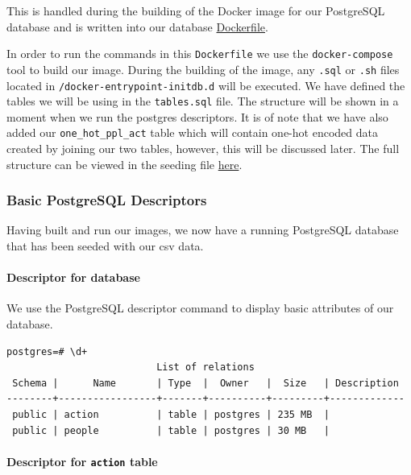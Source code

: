 \documentclass[]{report}
\begin{document}
This is handled during the building of the Docker image for our
PostgreSQL database and is written into our database
\href{https://github.com/joshuacook/redhat/blob/master/docker/postgres/Dockerfile}{Dockerfile}.

In order to run the commands in this \texttt{Dockerfile} we use the
\texttt{docker-compose} tool to build our image. During the building of
the image, any \texttt{.sql} or \texttt{.sh} files located in
\texttt{/docker-entrypoint-initdb.d} will be executed. We have defined
the tables we will be using in the \texttt{tables.sql} file. The
structure will be shown in a moment when we run the postgres
descriptors. It is of note that we have also added our
\texttt{one\_hot\_ppl\_act} table which will contain one-hot encoded
data created by joining our two tables, however, this will be discussed
later. The full structure can be viewed in the seeding file
\href{https://github.com/joshuacook/redhat/blob/master/docker/postgres/tables.sql}{here}.

\subsubsection{Basic PostgreSQL
Descriptors}\label{basic-postgresql-descriptors}

Having built and run our images, we now have a running PostgreSQL
database that has been seeded with our csv data.

\paragraph{Descriptor for database}\label{descriptor-for-database}

We use the PostgreSQL descriptor command to display basic attributes of
our database.

\begin{verbatim}
postgres=# \d+
                          List of relations
 Schema |      Name       | Type  |  Owner   |  Size   | Description
--------+-----------------+-------+----------+---------+-------------
 public | action          | table | postgres | 235 MB  |
 public | people          | table | postgres | 30 MB   |
\end{verbatim}

\pagebreak 

\paragraph{Descriptor for \texttt{action}
table}\label{descriptor-for-action-table}
\end{document}
